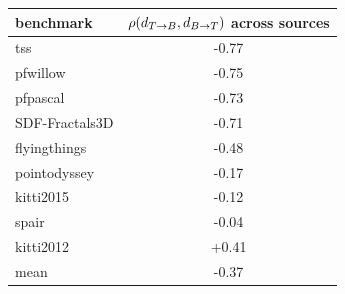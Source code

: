 \begin{tabular}{lc}
\toprule
benchmark & $\rho(d_{T\to B},d_{B\to T})$ across sources \\
\midrule
tss & -0.77 \\
pfwillow & -0.75 \\
pfpascal & -0.73 \\
SDF-Fractals3D & -0.71 \\
flyingthings & -0.48 \\
pointodyssey & -0.17 \\
kitti2015 & -0.12 \\
spair & -0.04 \\
kitti2012 & +0.41 \\
\midrule
mean & -0.37 \\
\bottomrule
\end{tabular}
